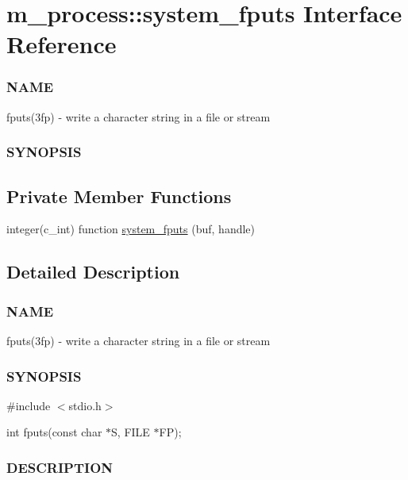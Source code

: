 \hypertarget{interfacem__process_1_1system__fputs}{}\section{m\+\_\+process\+:\+:system\+\_\+fputs Interface Reference}
\label{interfacem__process_1_1system__fputs}


\subsubsection*{N\+A\+ME}

fputs(3fp) -\/ write a character string in a file or stream \subsubsection*{S\+Y\+N\+O\+P\+S\+IS} 


\subsection*{Private Member Functions}
\begin{DoxyCompactItemize}
\item 
integer(c\+\_\+int) function \mbox{\hyperlink{interfacem__process_1_1system__fputs_a0a084cac4baf5058a79af7f6490c3a89}{system\+\_\+fputs}} (buf, handle)
\end{DoxyCompactItemize}


\subsection{Detailed Description}
\subsubsection*{N\+A\+ME}

fputs(3fp) -\/ write a character string in a file or stream \subsubsection*{S\+Y\+N\+O\+P\+S\+IS}

\#include $<$stdio.\+h$>$

int fputs(const char $\ast$\+S, F\+I\+L\+E $\ast$\+F\+P);

\subsubsection*{D\+E\+S\+C\+R\+I\+P\+T\+I\+ON}

